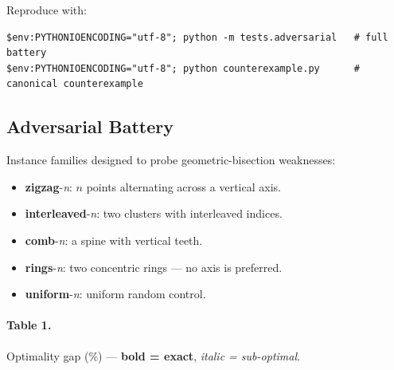 \documentclass[11pt,a4paper]{article}
\begin{document}
Reproduce with:
\begin{small}
\begin{verbatim}
$env:PYTHONIOENCODING="utf-8"; python -m tests.adversarial   # full battery
$env:PYTHONIOENCODING="utf-8"; python counterexample.py      # canonical counterexample
\end{verbatim}
\end{small}

\subsection{Adversarial Battery}

Instance families designed to probe geometric-bisection weaknesses:

\begin{itemize}
\item \textbf{zigzag}-\textit{n}: $n$ points alternating across a
vertical axis.
\item \textbf{interleaved}-\textit{n}: two clusters with interleaved
indices.
\item \textbf{comb}-\textit{n}: a spine with vertical teeth.
\item \textbf{rings}-\textit{n}: two concentric rings --- no axis is
preferred.
\item \textbf{uniform}-\textit{n}: uniform random control.
\end{itemize}

\paragraph{Table 1.} Optimality gap (\%) --- \textbf{bold = exact},
\textit{italic = sub-optimal}.
\end{document}

